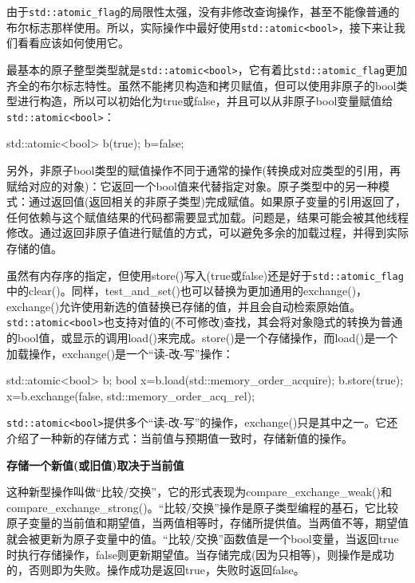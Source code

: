 由于\texttt{std::atomic\_flag}的局限性太强，没有非修改查询操作，甚至不能像普通的布尔标志那样使用。所以，实际操作中最好使用\texttt{std::atomic<bool>}，接下来让我们看看应该如何使用它。


最基本的原子整型类型就是\texttt{std::atomic<bool>}，它有着比\texttt{std::atomic\_flag}更加齐全的布尔标志特性。虽然不能拷贝构造和拷贝赋值，但可以使用非原子的bool类型进行构造，所以可以初始化为true或false，并且可以从非原子bool变量赋值给\texttt{std::atomic<bool>}：

\begin{cpp}
std::atomic<bool> b(true);
b=false;
\end{cpp}

另外，非原子bool类型的赋值操作不同于通常的操作(转换成对应类型的引用，再赋给对应的对象)：它返回一个bool值来代替指定对象。原子类型中的另一种模式：通过返回值(返回相关的非原子类型)完成赋值。如果原子变量的引用返回了，任何依赖与这个赋值结果的代码都需要显式加载。问题是，结果可能会被其他线程修改。通过返回非原子值进行赋值的方式，可以避免多余的加载过程，并得到实际存储的值。

虽然有内存序的指定，但使用store()写入(true或false)还是好于\texttt{std::atomic\_flag}中的clear()。同样，test\_and\_set()也可以替换为更加通用的exchange()，exchange()允许使用新选的值替换已存储的值，并且会自动检索原始值。\texttt{std::atomic<bool>}也支持对值的(不可修改)查找，其会将对象隐式的转换为普通的bool值，或显示的调用load()来完成。store()是一个存储操作，而load()是一个加载操作，exchange()是一个“读-改-写”操作：

\begin{cpp}
std::atomic<bool> b;
bool x=b.load(std::memory_order_acquire);
b.store(true);
x=b.exchange(false, std::memory_order_acq_rel);
\end{cpp}

\texttt{std::atomic<bool>}提供多个“读-改-写”的操作，exchange()只是其中之一。它还介绍了一种新的存储方式：当前值与预期值一致时，存储新值的操作。

\textbf{存储一个新值(或旧值)取决于当前值}

这种新型操作叫做“比较/交换”，它的形式表现为compare\_exchange\_weak()和compare\_exchange\_strong()。“比较/交换”操作是原子类型编程的基石，它比较原子变量的当前值和期望值，当两值相等时，存储所提供值。当两值不等，期望值就会被更新为原子变量中的值。“比较/交换”函数值是一个bool变量，当返回true时执行存储操作，false则更新期望值。当存储完成(因为只相等)，则操作是成功的，否则即为失败。操作成功是返回true，失败时返回false。

